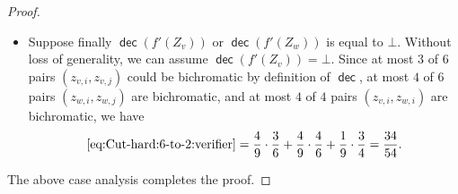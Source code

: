 \documentclass[11pt,fleqn]{article}
\DeclareMathOperator{\dec}{\mathsf{dec}}
\newcommand{\f}{f}
\theoremstyle{definition}
\numberwithin{equation}{section}
\begin{document}
\begin{proof}
\begin{itemize}
    \item
    Suppose finally $\dec(\f'(Z_v))$ or $\dec(\f'(Z_w))$ is equal to $\bot$.
    Without loss of generality, we can assume $\dec(\f'(Z_v)) = \bot$.
    Since
    at most $3$ of $6$ pairs $(z_{v,i}, z_{v,j})$ could be bichromatic by definition of $\dec$,
    at most $4$ of $6$ pairs $(z_{w,i}, z_{w,j})$ are bichromatic, and
    at most $4$ of $4$ pairs $(z_{v,i}, z_{w,i})$ are bichromatic,
    we have
    \begin{align}
        \text{\cref{eq:Cut-hard:6-to-2:verifier}} =
        \frac{4}{9} \cdot \frac{3}{6} + \frac{4}{9} \cdot \frac{4}{6} + \frac{1}{9} \cdot \frac{3}{4}
        = \frac{34}{54}.
    \end{align}
\end{itemize}
The above case analysis completes the proof.
\end{proof}
\end{document}
